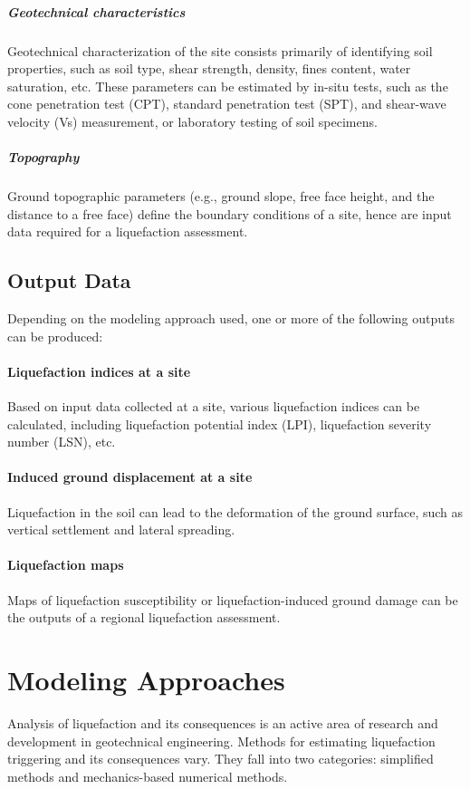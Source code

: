 \subparagraph{Geotechnical characteristics}
Geotechnical characterization of the site consists primarily of identifying soil properties, such as soil type, shear strength, density, fines content, water saturation, etc. These parameters can be estimated by in-situ tests, such as the cone penetration test (CPT), standard penetration test (SPT), and shear-wave velocity (Vs) measurement, or laboratory testing of soil specimens.

\subparagraph{Topography}
Ground topographic parameters (e.g., ground slope, free face height, and the distance to a free face) define the boundary conditions of a site, hence are input data required for a liquefaction assessment. 


\subsection{Output Data}
\label{subsec:eq_liquefaction_output}
Depending on the modeling approach used, one or more of the following outputs can be produced:

\paragraph{Liquefaction indices at a site}
Based on input data collected at a site, various liquefaction indices can be calculated, including liquefaction potential index (LPI), liquefaction severity number (LSN), etc.

\paragraph{Induced ground displacement at a site}
Liquefaction in the soil can lead to the deformation of the ground surface, such as vertical settlement and lateral spreading.

\paragraph{Liquefaction maps}
Maps of liquefaction susceptibility or liquefaction-induced ground damage can be the outputs of a regional liquefaction assessment. 

\section{Modeling Approaches}
\label{sec:eq_liq_methods}

Analysis of liquefaction and its consequences is an active area of research and development in geotechnical engineering. Methods for estimating liquefaction triggering and its consequences vary. They fall into two categories: simplified methods and mechanics-based numerical methods.

